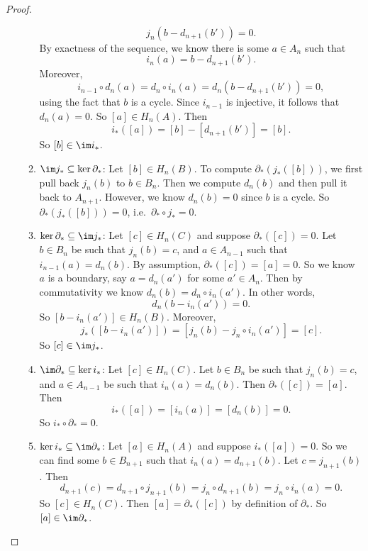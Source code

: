 \documentclass[a4paper]{article}
\begin{document}
\begin{proof}
\begin{enumerate}
\begin{enumerate}
          \[
            j_n (b - d_{n + 1}(b')) = 0.
          \]
          By exactness of the sequence, we know there is some $a \in A_n$ such that
          \[
            i_n(a) = b - d_{n + 1}(b').
          \]
          Moreover,
          \[
            i_{n - 1} \circ d_n(a) = d_n \circ i_n (a) = d_n(b - d_{n + 1}(b')) = 0,
          \]
          using the fact that $b$ is a cycle. Since $i_{n - 1}$ is injective, it follows that $d_n(a) = 0$. So $[a] \in H_n(A)$. Then
          \[
            i_*([a]) = [b] - [d_{n + 1}(b')] = [b].
          \]
          So $[b] \in \im i_*$.
        \item $\im j_* \subseteq \ker \partial_*$: Let $[b] \in H_n(B)$. To compute $\partial_*(j_*([b]))$, we first pull back $j_n(b)$ to $b \in B_n$. Then we compute $d_n(b)$ and then pull it back to $A_{n + 1}$. However, we know $d_n(b) = 0$ since $b$ is a cycle. So $\partial_*(j_*([b])) = 0$, i.e.\ $\partial_* \circ j_* = 0$.
        \item $\ker \partial_* \subseteq \im j_*$: Let $[c] \in H_n(C)$ and suppose $\partial_*([c]) = 0$. Let $b \in B_n$ be such that $j_n(b) = c$, and $a \in A_{n - 1}$ such that $i_{n - 1}(a) = d_n(b)$. By assumption, $\partial_*([c]) = [a] = 0$. So we know $a$ is a boundary, say $a = d_n (a')$ for some $a' \in A_n$. Then by commutativity we know $d_n(b) = d_n \circ i_n (a')$. In other words,
          \[
            d_n(b - i_n(a')) = 0.
          \]
          So $[b - i_n(a')] \in H_n(B)$. Moreover,
          \[
            j_*([b - i_n(a')]) = [j_n(b) - j_n \circ i_n(a')] = [c].
          \]
          So $[c] \in \im j_*$.
        \item $\im \partial_* \subseteq \ker i_*$: Let $[c] \in H_n(C)$. Let $b \in B_n$ be such that $j_n(b) = c$, and $a \in A_{n - 1}$ be such that $i_n(a) = d_n(b)$. Then $\partial_*([c]) = [a]$. Then
          \[
            i_*([a]) = [i_n(a)] = [d_n(b)] = 0.
          \]
          So $i_* \circ \partial_* = 0$.
        \item $\ker i_* \subseteq \im \partial_*$: Let $[a] \in H_n(A)$ and suppose $i_*([a]) = 0$. So we can find some $b \in B_{n + 1}$ such that $i_n(a) = d_{n + 1}(b)$. Let $c = j_{n + 1}(b)$. Then
          \[
            d_{n + 1}(c) = d_{n + 1}\circ j_{n + 1} (b) = j_n \circ d_{n + 1}(b) = j_n \circ i_n (a) = 0.
          \]
          So $[c] \in H_n(C)$. Then $[a] = \partial_*([c])$ by definition of $\partial_*$. So $[a] \in \im \partial_*$.
      \end{enumerate}
  \end{enumerate}
\end{proof}
\end{document}
